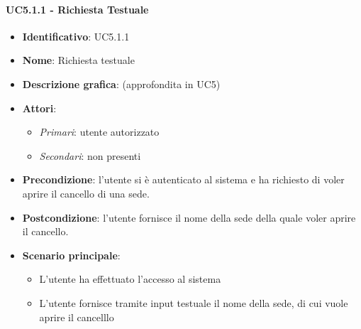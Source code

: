 \paragraph{UC5.1.1 - Richiesta Testuale}
\begin{itemize}
   \item \textbf{Identificativo}: UC5.1.1
   \item \textbf{Nome}: Richiesta testuale
   \item \textbf{Descrizione grafica}: (approfondita in UC5)
   \item \textbf{Attori}:
   \begin{itemize} 
       \item \textit{Primari}: utente autorizzato
       \item \textit{Secondari}: non presenti
   \end{itemize}
       \item \textbf{Precondizione}: l'utente si è autenticato al sistema e ha richiesto di voler aprire il cancello di una sede. 
       \item \textbf{Postcondizione}: l'utente fornisce il nome della sede della quale voler aprire il cancello.
    \item \textbf{Scenario principale}: 
       \begin{itemize}
           \item L'utente ha effettuato l'accesso al sistema 
           \item L'utente fornisce tramite input testuale il nome della sede, di cui vuole aprire il cancelllo
       \end{itemize}
\end{itemize}

